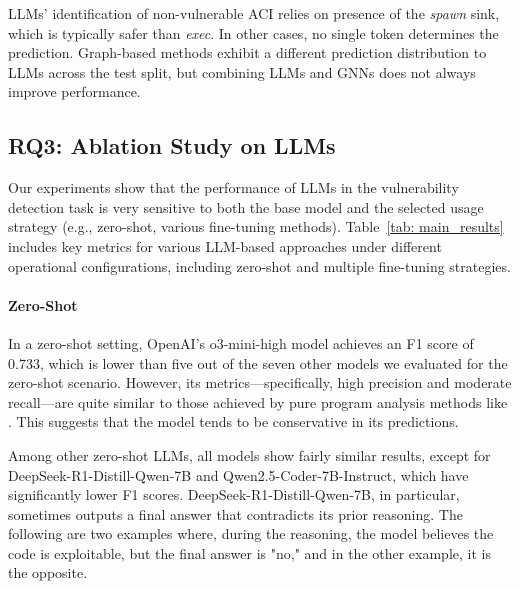 \documentclass[12pt,openany,oneside,table]{cmuthesis}
\begin{document}
\begin{tcolorbox}[colback=white,colframe=black,arc=0pt,boxrule=0.5pt,title=RQ2 Summary,boxsep=2pt,left=1pt,right=1pt,top=1pt,bottom=1pt,fonttitle=\bfseries]
LLMs' identification of non-vulnerable ACI relies on
presence of the \textit{spawn} sink, which is typically safer than \textit{exec}. 
In other cases, no single token determines the prediction.
Graph-based methods exhibit a different prediction distribution to LLMs across the test split, but combining LLMs and GNNs does not always improve performance.
\end{tcolorbox}

\subsection{RQ3: Ablation Study on LLMs}
\label{subsec:rq4}

Our experiments show that the performance of LLMs in the vulnerability detection task is very sensitive to both the base model and the selected usage strategy (e.g., zero-shot, various fine-tuning methods). Table~\ref{tab: main_results} includes key metrics for various LLM-based approaches under different operational configurations, including zero-shot and multiple fine-tuning strategies.

\paragraph{Zero-Shot}
In a zero-shot setting, OpenAI's o3-mini-high model achieves an F1 score of 0.733, which is lower than five out of the seven other models we evaluated for the zero-shot scenario.
However, its metrics—specifically, high precision and moderate recall—are quite similar to those achieved by pure program analysis methods like \nodemedicfine. This suggests that the model tends to be conservative in its predictions.

Among other zero-shot LLMs, all models show fairly similar results, except for DeepSeek-R1-Distill-Qwen-7B and Qwen2.5-Coder-7B-Instruct, which have significantly lower F1 scores. DeepSeek-R1-Distill-Qwen-7B, in particular, sometimes outputs a final answer that contradicts its prior reasoning. The following are two examples where, during the reasoning, the model believes the code is exploitable, but the final answer is "no," and in the other example, it is the opposite.
\end{document}
